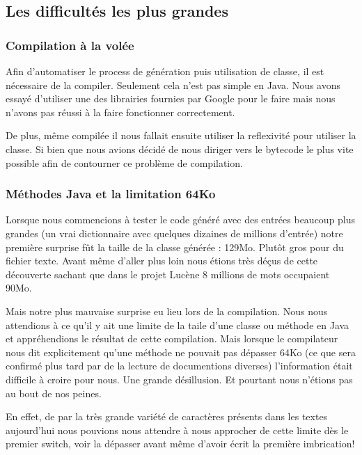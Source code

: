 \subsection{Les difficultés les plus grandes}

\subsubsection{Compilation à la volée}

Afin d'automatiser le process de génération puis utilisation de classe, il est nécessaire
de la compiler. Seulement cela n'est pas simple en Java.
Nous avons essayé d'utiliser une des librairies fournies par Google pour le faire
mais nous n'avons pas réussi à la faire fonctionner correctement.

De plus, même compilée il nous fallait ensuite utiliser la reflexivité pour utiliser la
classe. Si bien que nous avions décidé de nous diriger vers le bytecode le plus vite possible
afin de contourner ce problème de compilation.

\subsubsection{Méthodes Java et la limitation 64Ko}

Lorsque nous commencions à tester le code généré avec des entrées beaucoup plus grandes
(un vrai dictionnaire avec quelques dizaines de millions d'entrée) notre première
surprise fût la taille de la classe générée : 129Mo. Plutôt gros pour du fichier texte.
Avant même d'aller plus loin nous étions très déçus de cette découverte sachant que dans le
projet Lucène 8 millions de mots occupaient 90Mo.


Mais notre plus mauvaise surprise eu lieu lors de la compilation. Nous nous attendions
à ce qu'il y ait une limite de la taile d'une classe ou méthode en Java et appréhendions
le résultat de cette compilation. Mais lorsque le compilateur nous dit explicitement
qu'une méthode ne pouvait pas dépasser 64Ko (ce que sera confirmé plus tard par de la lecture de documentions diverses) l'information était difficile à croire pour nous.
Une grande désillusion. Et pourtant nous n'étions pas au bout de nos peines.


En effet, de par la très grande variété de caractères présents dans les textes aujourd'hui
nous pouvions nous attendre à nous approcher de cette limite dès le premier switch, voir la
dépasser avant même d'avoir écrit la première imbrication!


